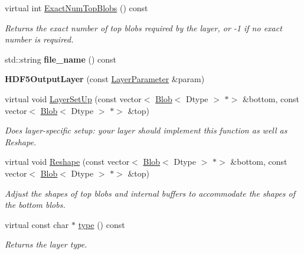 \begin{DoxyCompactItemize}
virtual int \mbox{\hyperlink{classcaffe_1_1_h_d_f5_output_layer_ad11b8da0a6217a0f9a63789b360b1c99}{Exact\+Num\+Top\+Blobs}} () const
\begin{DoxyCompactList}\small\item\em Returns the exact number of top blobs required by the layer, or -\/1 if no exact number is required. \end{DoxyCompactList}\item 
\mbox{\label{classcaffe_1_1_h_d_f5_output_layer_a94e43437239c6235f36922aaeac861e1}} 
std\+::string {\bfseries file\+\_\+name} () const
\item 
\mbox{\label{classcaffe_1_1_h_d_f5_output_layer_acf9e02d15a72cb6838e8fd2860e046b5}} 
{\bfseries H\+D\+F5\+Output\+Layer} (const \mbox{\hyperlink{classcaffe_1_1_layer_parameter}{Layer\+Parameter}} \&param)
\item 
virtual void \mbox{\hyperlink{classcaffe_1_1_h_d_f5_output_layer_afb7ab27b33e5eaec6c50893f28748c14}{Layer\+Set\+Up}} (const vector$<$ \mbox{\hyperlink{classcaffe_1_1_blob}{Blob}}$<$ Dtype $>$ $\ast$$>$ \&bottom, const vector$<$ \mbox{\hyperlink{classcaffe_1_1_blob}{Blob}}$<$ Dtype $>$ $\ast$$>$ \&top)
\begin{DoxyCompactList}\small\item\em Does layer-\/specific setup\+: your layer should implement this function as well as Reshape. \end{DoxyCompactList}\item 
virtual void \mbox{\hyperlink{classcaffe_1_1_h_d_f5_output_layer_afaed17dc14251e627764334d54e55c4d}{Reshape}} (const vector$<$ \mbox{\hyperlink{classcaffe_1_1_blob}{Blob}}$<$ Dtype $>$ $\ast$$>$ \&bottom, const vector$<$ \mbox{\hyperlink{classcaffe_1_1_blob}{Blob}}$<$ Dtype $>$ $\ast$$>$ \&top)
\begin{DoxyCompactList}\small\item\em Adjust the shapes of top blobs and internal buffers to accommodate the shapes of the bottom blobs. \end{DoxyCompactList}\item 
\mbox{\label{classcaffe_1_1_h_d_f5_output_layer_aebde1cfc48583ce0d2e85ea0542a7077}} 
virtual const char $\ast$ \mbox{\hyperlink{classcaffe_1_1_h_d_f5_output_layer_aebde1cfc48583ce0d2e85ea0542a7077}{type}} () const
\begin{DoxyCompactList}\small\item\em Returns the layer type. \end{DoxyCompactList}\item 

\end{DoxyCompactItemize}
